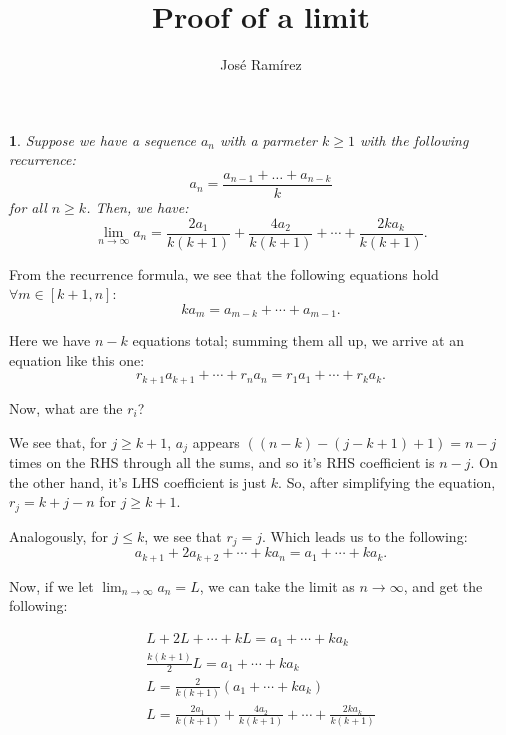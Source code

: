 \documentclass[11pt]{article}
\title{Proof of a limit}
\author{José Ramírez}
\newtheorem{prf}{}
\begin{document}
\maketitle

\begin{prf}
Suppose we have a sequence $a_n$ with a parmeter $k \ge 1$ with the following recurrence:
$$
	a_n = \frac{a_{n - 1} + \dots + a_{n - k}}{k}
$$
for all $n \ge k$. Then, we have:
$$
	\lim_{n \to \infty} a_n = \frac{2a_1}{k(k + 1)} + \frac{4a_2}{k(k + 1)} + \cdots + \frac{2ka_k}{k(k + 1)}.
$$
\end{prf}


From the recurrence formula, we see that the following equations hold $\forall m \in [k + 1, n]$:
$$
	ka_m = a_{m - k} + \cdots + a_{m - 1}.
$$


Here we have $n - k$ equations total; summing them all up, we arrive at an equation like this one:
$$
	r_{k + 1}a_{k + 1} + \cdots + r_na_n = r_1a_1 + \cdots + r_ka_k.
$$

Now, what are the $r_i$?

We see that, for $j \ge k + 1$, $a_j$ appears $((n - k) - (j - k + 1) + 1) = n - j$ times on the RHS through all the sums, and so it's RHS coefficient is $n - j$.
On the other hand, it's LHS coefficient is just $k$. So, after simplifying the equation, $r_j = k + j - n$ for $j \ge k + 1$.

Analogously, for $j \le k$, we see that $r_j = j$. Which leads us to the following:
$$
	a_{k + 1} + 2a_{k + 2} + \cdots + ka_n = a_1 + \cdots + ka_k.
$$

Now, if we let $\lim_{n \to \infty}a_n = L$, we can take the limit as $n \to \infty$, and get the following:

\begin{eqnarray*}
	L + 2L + \cdots + kL = a_1 + \cdots + ka_k\\
	\frac{k(k + 1)}{2}L = a_1 + \cdots + ka_k\\
	L = \frac{2}{k(k + 1)}(a_1 + \cdots + ka_k)\\
	L = \frac{2a_1}{k(k + 1)} + \frac{4a_2}{k(k + 1)} + \cdots + \frac{2ka_k}{k(k + 1)}
\end{eqnarray*}
\end{document}
